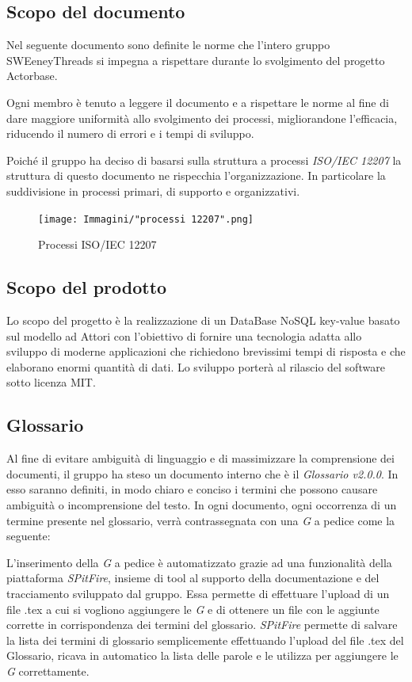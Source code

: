 \documentclass[a4paper]{article}
\begin{document}
		\subsection{Scopo del documento}
			Nel seguente documento sono definite le norme che l'intero gruppo SWEeneyThreads si
			impegna a rispettare durante lo svolgimento
			del progetto Actorbase.

			Ogni membro è tenuto a leggere il documento e a rispettare le norme al fine di dare maggiore uniformità
			allo svolgimento dei processi,
			migliorandone l'efficacia, riducendo il numero di errori e i tempi di sviluppo.

			Poiché il gruppo ha deciso di basarsi sulla struttura a processi \emph{ISO/IEC 12207}
			la struttura di questo documento ne rispecchia
			l'organizzazione. In particolare la suddivisione in processi primari, di supporto e organizzativi.
			\begin{figure}[H]
				\centering
				\texttt{[image: Immagini/"processi 12207".png]}
				\caption{Processi ISO/IEC 12207}
			\end{figure}
		\subsection{Scopo del prodotto}
			Lo scopo del progetto è la realizzazione di un DataBase NoSQL key-value basato sul modello ad
			Attori con l'obiettivo di fornire una tecnologia adatta allo sviluppo di moderne
			applicazioni che richiedono brevissimi tempi di risposta e che elaborano enormi quantità
			di dati. Lo sviluppo porterà al rilascio del software sotto licenza MIT.
		\subsection{Glossario}
			Al fine di evitare ambiguità di linguaggio e di massimizzare la comprensione dei documenti, il
	      	gruppo ha steso un documento interno che è il \emph{Glossario v2.0.0}. In esso saranno definiti, in modo
	      	chiaro e conciso i termini che possono causare ambiguità o incomprensione del testo. In ogni documento,
	      	ogni occorrenza di un termine presente nel glossario, verrà contrassegnata con una \emph{G} a pedice come la seguente:
	      	\newline
	      	\begin{center}
	      	\end{center}
	      	L'inserimento della \emph{G} a pedice è automatizzato grazie ad una funzionalità della piattaforma \emph{SPitFire}, insieme di tool al supporto della documentazione e del tracciamento sviluppato dal gruppo. Essa permette di effettuare l'upload di un file .tex a cui si vogliono aggiungere le \emph{G} e di ottenere un file con le aggiunte corrette in corrispondenza dei termini del glossario. \emph{SPitFire} permette di salvare la lista dei termini di glossario semplicemente effettuando l'upload del file .tex del Glossario, ricava in automatico la lista delle parole e le utilizza per aggiungere le \emph{G} correttamente.
\end{document}
